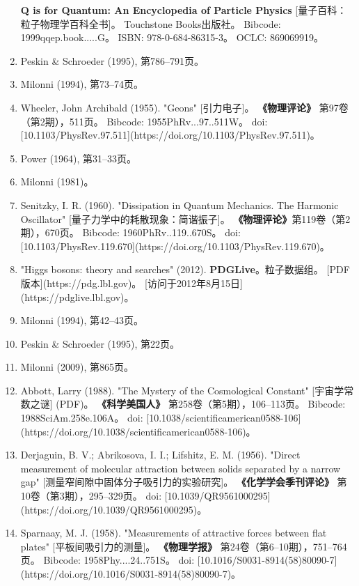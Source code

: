 \begin{enumerate}
  \textbf{Q is for Quantum: An Encyclopedia of Particle Physics} [量子百科：粒子物理学百科全书]。  
  Touchstone Books出版社。  
  Bibcode: 1999qqep.book.....G。  
  ISBN: 978-0-684-86315-3。  
  OCLC: 869069919。  
\item Peskin & Schroeder (1995), 第786–791页。 
\item Milonni (1994), 第73–74页。 
\item Wheeler, John Archibald (1955).
  "Geons" [引力电子]。  
  \textbf{《物理评论》} 第97卷（第2期），511页。  
  Bibcode: 1955PhRv...97..511W。  
  doi: [10.1103/PhysRev.97.511](https://doi.org/10.1103/PhysRev.97.511)。  
\item Power (1964), 第31–33页。  
\item Milonni (1981)。  
\item Senitzky, I. R. (1960).  
  "Dissipation in Quantum Mechanics. The Harmonic Oscillator" [量子力学中的耗散现象：简谐振子]。  
  \textbf{《物理评论》}第119卷（第2期），670页。  
  Bibcode: 1960PhRv..119..670S。  
  doi: [10.1103/PhysRev.119.670](https://doi.org/10.1103/PhysRev.119.670)。  
\item "Higgs bosons: theory and searches" (2012).  
  \textbf{PDGLive}。粒子数据组。  
  [PDF版本](https://pdg.lbl.gov)。  
  [访问于2012年8月15日](https://pdglive.lbl.gov)。  
\item Milonni (1994), 第42–43页。 
\item Peskin & Schroeder (1995), 第22页。 
\item Milonni (2009), 第865页。 
\item Abbott, Larry (1988).  
  "The Mystery of the Cosmological Constant" [宇宙学常数之谜] (PDF)。  
  \textbf{《科学美国人》} 第258卷（第5期），106–113页。  
  Bibcode: 1988SciAm.258e.106A。  
  doi: [10.1038/scientificamerican0588-106](https://doi.org/10.1038/scientificamerican0588-106)。  
\item Derjaguin, B. V.; Abrikosova, I. I.; Lifshitz, E. M. (1956). 
  "Direct measurement of molecular attraction between solids separated by a narrow gap" [测量窄间隙中固体分子吸引力的实验研究]。  
  \textbf{《化学学会季刊评论》} 第10卷（第3期），295–329页。  
  doi: [10.1039/QR9561000295](https://doi.org/10.1039/QR9561000295)。  
\item Sparnaay, M. J. (1958).  
  "Measurements of attractive forces between flat plates" [平板间吸引力的测量]。  
  \textbf{《物理学报》} 第24卷（第6–10期），751–764页。  
  Bibcode: 1958Phy....24..751S。  
  doi: [10.1016/S0031-8914(58)80090-7](https://doi.org/10.1016/S0031-8914(58)80090-7)。  

\end{enumerate}
